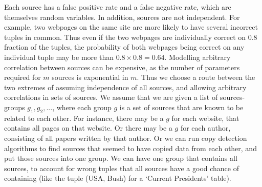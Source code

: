 \documentclass{sig-alternate}
\newcounter{prob}
\begin{document}
Each source has a false positive rate and a false negative rate, which are themselves random variables. In addition, sources are not independent. For example, two webpages on the same site are more likely to have several incorrect tuples in common. Thus even if the two webpages are individually correct on $0.8$ fraction of the tuples, the probability of both webpages being correct on any individual tuple may be more than $0.8 \times 0.8 = 0.64$. Modelling arbitrary correlation between sources can be expensive, as the number of parameters required for $m$ sources is exponential in $m$. Thus we choose a route between the two extremes of assuming independence of all sources, and allowing arbitrary correlations in sets of sources. We assume that we are given a list of sources-groups $g_1, g_2, ...$, where each group $g$ is a set of sources that are known to be related to each other. For instance, there may be a $g$ for each website, that contains all pages on that website. Or there may be a $g$ for each author, consisting of all papers written by that author. Or we can run copy detection algorithms to find sources that seemed to have copied data from each other, and put those sources into one group. We can have one group that contains all sources, to account for wrong tuples that all sources have a good chance of containing (like the tuple (USA, Bush) for a `Current Presidents' table).
\end{document}
